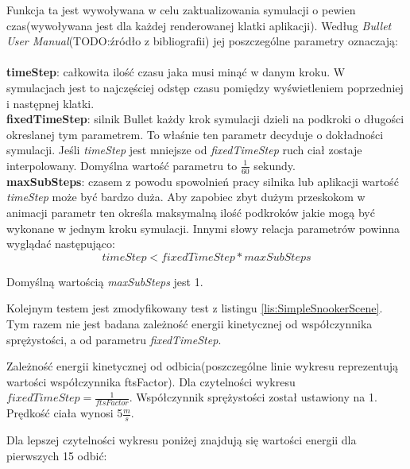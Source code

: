 Funkcja ta jest wywoływana w celu zaktualizowania symulacji o pewien
czas(wywoływana jest dla każdej renderowanej klatki aplikacji). Według
\emph{Bullet User Manual}(TODO:źródło z bibliografii) jej poszczególne parametry
oznaczają:\\
\\
\textbf{timeStep}: całkowita ilość czasu jaka musi minąć w danym kroku. W
symulacjach jest to najczęściej odstęp czasu pomiędzy wyświetleniem poprzedniej
i następnej klatki.\\
\textbf{fixedTimeStep}: silnik Bullet każdy krok symulacji dzieli na podkroki o
długości okreslanej tym parametrem. To właśnie ten parametr decyduje o
dokładności symulacji. Jeśli \emph{timeStep} jest mniejsze od
\emph{fixedTimeStep} ruch ciał zostaje interpolowany. Domyślna wartość parametru
to $ \frac{1}{60} $ sekundy.\\
\textbf{maxSubSteps}: czasem z powodu spowolnień pracy silnika lub aplikacji
wartość \emph{timeStep} może być bardzo duża. Aby zapobiec zbyt dużym przeskokom
w animacji parametr ten określa maksymalną ilość podkroków jakie mogą być
wykonane w jednym kroku symulacji. Innymi słowy relacja parametrów powinna
wyglądać następująco:\\
\begin{equation}
timeStep < fixedTimeStep * maxSubSteps
\end{equation}

Domyślną wartością \emph{maxSubSteps} jest 1.

Kolejnym testem jest zmodyfikowany test z listingu \ref{lis:SimpleSnookerScene}.
Tym razem nie jest badana zależność energii kinetycznej od współczynnika
sprężystości, a od parametru \emph{fixedTimeStep}. 



Zależność energii kinetycznej od odbicia(poszczególne linie wykresu
reprezentują wartości współczynnika ftsFactor). Dla czytelności wykresu $
fixedTimeStep = \frac{1}{ftsFactor} $. Współczynnik sprężystości został
ustawiony na 1. Prędkość ciała wynosi 5$\frac{m}{s}$.



Dla lepszej czytelności wykresu poniżej znajdują się wartości energii dla
pierwszych 15 odbić:



